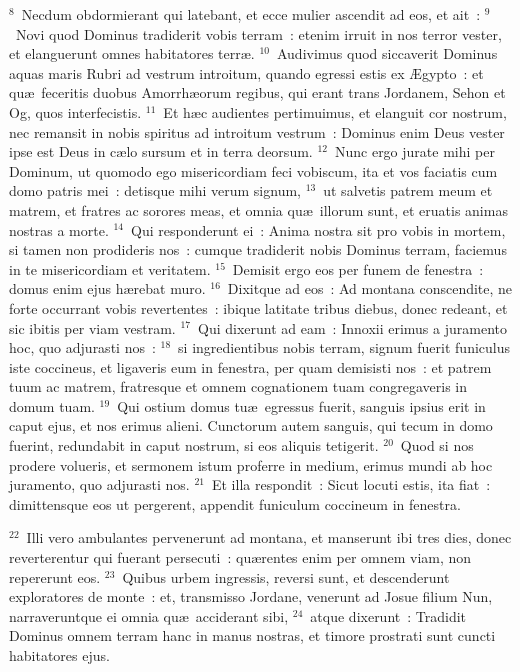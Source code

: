 ${}^{8}$~Necdum obdormierant qui latebant, et ecce mulier ascendit ad eos, et ait~:
${}^{9}$~Novi quod Dominus tradiderit vobis terram~: etenim irruit in nos terror vester, et elanguerunt omnes habitatores terr\ae .
${}^{10}$~Audivimus quod siccaverit Dominus aquas maris Rubri ad vestrum introitum, quando egressi estis ex \AE gypto~: et qu\ae\ feceritis duobus Amorrh\ae orum regibus, qui erant trans Jordanem, Sehon et Og, quos interfecistis.
${}^{11}$~Et h\ae c audientes pertimuimus, et elanguit cor nostrum, nec remansit in nobis spiritus ad introitum vestrum~: Dominus enim Deus vester ipse est Deus in c\ae lo sursum et in terra deorsum.
${}^{12}$~Nunc ergo jurate mihi per Dominum, ut quomodo ego misericordiam feci vobiscum, ita et vos faciatis cum domo patris mei~: detisque mihi verum signum,
${}^{13}$~ut salvetis patrem meum et matrem, et fratres ac sorores meas, et omnia qu\ae\ illorum sunt, et eruatis animas nostras a morte.
${}^{14}$~Qui responderunt ei~: Anima nostra sit pro vobis in mortem, si tamen non prodideris nos~: cumque tradiderit nobis Dominus terram, faciemus in te misericordiam et veritatem.
${}^{15}$~Demisit ergo eos per funem de fenestra~: domus enim ejus h\ae rebat muro.
${}^{16}$~Dixitque ad eos~: Ad montana conscendite, ne forte occurrant vobis revertentes~: ibique latitate tribus diebus, donec redeant, et sic ibitis per viam vestram.
${}^{17}$~Qui dixerunt ad eam~: Innoxii erimus a juramento hoc, quo adjurasti nos~:
${}^{18}$~si ingredientibus nobis terram, signum fuerit funiculus iste coccineus, et ligaveris eum in fenestra, per quam demisisti nos~: et patrem tuum ac matrem, fratresque et omnem cognationem tuam congregaveris in domum tuam.
${}^{19}$~Qui ostium domus tu\ae\ egressus fuerit, sanguis ipsius erit in caput ejus, et nos erimus alieni. Cunctorum autem sanguis, qui tecum in domo fuerint, redundabit in caput nostrum, si eos aliquis tetigerit.
${}^{20}$~Quod si nos prodere volueris, et sermonem istum proferre in medium, erimus mundi ab hoc juramento, quo adjurasti nos.
${}^{21}$~Et illa respondit~: Sicut locuti estis, ita fiat~: dimittensque eos ut pergerent, appendit funiculum coccineum in fenestra.


${}^{22}$~Illi vero ambulantes pervenerunt ad montana, et manserunt ibi tres dies, donec reverterentur qui fuerant persecuti~: qu\ae rentes enim per omnem viam, non repererunt eos.
${}^{23}$~Quibus urbem ingressis, reversi sunt, et descenderunt exploratores de monte~: et, transmisso Jordane, venerunt ad Josue filium Nun, narraveruntque ei omnia qu\ae\ acciderant sibi,
${}^{24}$~atque dixerunt~: Tradidit Dominus omnem terram hanc in manus nostras, et timore prostrati sunt cuncti habitatores ejus.

